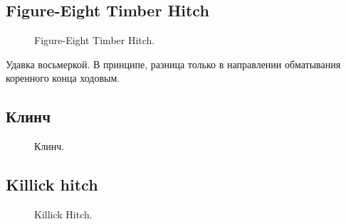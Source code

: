 \subsection{Figure-Eight Timber Hitch}

\begin{figure}[H]\centering
	\begin{minipage}{1\linewidth}
		\begin{center}
			\tcbox[enhanced jigsaw,colframe=black,opacityframe=0.5,opacityback=0.5]
			{\centering{}}
		\end{center}
	\end{minipage}
\caption{Figure-Eight Timber Hitch.}
\label{ris:Figure-Eight_Timber_Hitch}
\end{figure}

Удавка восьмеркой. В принципе, разница только в направлении обматывания коренного конца ходовым.

\subsection{Клинч}


\begin{figure}[H]\centering
	\begin{minipage}{1\linewidth}
		\begin{center}
			\tcbox[enhanced jigsaw,colframe=black,opacityframe=0.5,opacityback=0.5]
			{\centering{}}
		\end{center}
	\end{minipage}
\caption{Клинч.}
\label{ris:Clinch}
\end{figure}

\subsection{Killick hitch}

\begin{figure}[H]\centering
	\begin{minipage}{1\linewidth}
		\begin{center}
			\tcbox[enhanced jigsaw,colframe=black,opacityframe=0.5,opacityback=0.5]
			{\centering{}}
		\end{center}
	\end{minipage}
\caption{Killick Hitch.}
\label{ris:Killick_hitch}
\end{figure}

